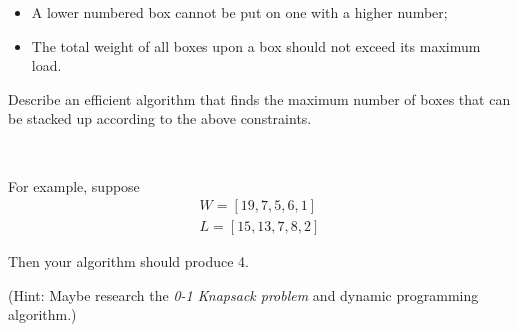 \documentclass[12pt]{article}
\begin{document}
\begin{itemize}
    \item A lower numbered box cannot be put on one with a higher number;
    \item The total weight of all boxes upon a box should not exceed its maximum load.
\end{itemize}

Describe an efficient algorithm that finds the maximum number of boxes that can be stacked up according to the above constraints.

~

For example, suppose
\[ \begin{array}{l}
    W = [ 19, 7, 5, 6, 1 ] \\
    L = [ 15, 13, 7, 8, 2 ] 
\end{array}\]

Then your algorithm should produce 4. 

(Hint: Maybe research the \emph{0-1 Knapsack problem} and dynamic programming algorithm.)
\end{document}

